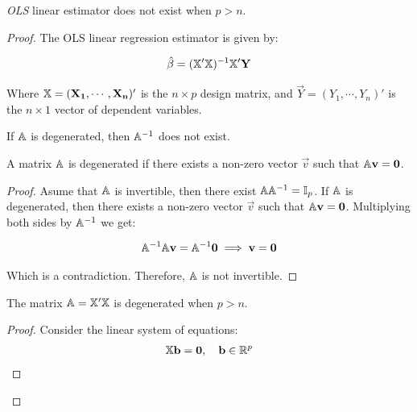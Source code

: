\begin{claim*}
    \emph{OLS} linear estimator does not exist when $p > n$.

    \begin{proof}
        The OLS linear regression estimator is given by:

        \begin{align*}
            \hat{\beta} = (\mathbb{X}'\mathbb{X})^{-1}\mathbb{X}'\mathbf{Y}
        \end{align*}

        Where $\mathbb{X} = (\mathbf{X_1}, \cdots, \mathbf{X_n})'$ is the $n \times p$ design matrix, and $\Vec{Y} = (Y_1, \cdots, Y_n)'$ is the $n \times 1$ vector of dependent variables. 

        \begin{lemma*}
            If $\mathbb{A}$ is degenerated, then $\mathbb{A}^{-1}$ does not exist.

            \begin{def*}
            A matrix $\mathbb{A}$ is degenerated if there exists a non-zero vector $\Vec{v}$ such that $\mathbb{A}\mathbf{v} = \mathbf{0}$.
            \end{def*}

            \begin{proof}
                Asume that $\mathbb{A}$ is invertible, then there exist $\mathbb{A}\mathbb{A}^{-1} = \mathbb{I}_p$. If $\mathbb{A}$ is degenerated, then there exists a non-zero vector $\Vec{v}$ such that $\mathbb{A}\mathbf{v} = \mathbf{0}$. Multiplying both sides by $\mathbb{A}^{-1}$ we get:

                \begin{align*}
                    \mathbb{A}^{-1}\mathbb{A}\mathbf{v} = \mathbb{A}^{-1}\mathbf{0} \implies \mathbf{v} = \mathbf{0}
                \end{align*}

                Which is a contradiction. Therefore, $\mathbb{A}$ is not invertible.
            \end{proof}
        \end{lemma*}

        \begin{lemma*}
            The matrix $\mathbb{A} = \mathbb{X}'\mathbb{X}$ is degenerated when $p > n$.

            \begin{proof}
                Consider the linear system of equations:
                \begin{align*}
                \mathbb{X}\mathbf{b} = \mathbf{0}, \quad \mathbf{b} \in \mathbb{R}^p
                \end{align*}


\end{proof}
\end{lemma*}
\end{proof}
\end{claim*}
